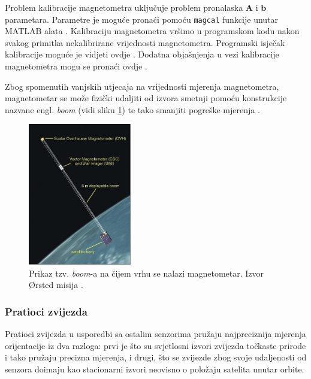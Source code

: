 \documentclass[times, utf8, diplomski, numeric]{templates/template}
\begin{document}
{{{{                Problem kalibracije magnetometra uključuje problem pronalaska $\boldsymbol{A}$ i $\boldsymbol{b}$ parametara. Parametre je moguće pronaći pomoću \texttt{magcal} funkcije unutar MATLAB alata \cite{magcal}. Kalibraciju magnetometra vršimo u programskom kodu nakon svakog primitka nekalibrirane vrijednosti magnetometra. Programski isječak kalibracije moguće je vidjeti ovdje \cite{kalibracijaMagKod}. Dodatna objašnjenja u vezi kalibracije magnetometra mogu se pronaći ovdje \cite{kalibracijaMatlabStranica}.

                Zbog spomenutih vanjskih utjecaja na vrijednosti mjerenja magnetometra, magnetometar se može fizički udaljiti od izvora smetnji pomoću konstrukcije nazvane engl. \emph{boom} (vidi sliku \ref{fig:boom}) te tako smanjiti pogreške mjerenja \cite{adcsKnjiga}. 

                \begin{figure}[h!]
                \centering
                \includegraphics[width=0.4\textwidth]{images/boom.jpg}
                \caption{Prikaz tzv. \emph{boom}-a na čijem vrhu se nalazi magnetometar. Izvor Ørsted misija \cite{boomCite}.}
                \label{fig:boom}
                \end{figure}
            }

            \subsubsection{Pratioci zvijezda }{
                Pratioci zvijezda u usporedbi sa ostalim senzorima pružaju najpreciznija mjerenja orijentacije iz dva razloga: prvi je što su svjetlosni izvori zvijezda točkaste prirode i tako pružaju precizna mjerenja, i drugi, što se zvijezde zbog svoje udaljenosti od senzora doimaju kao stacionarni izvori neovisno o položaju satelita unutar orbite.

}}}}
\end{document}

